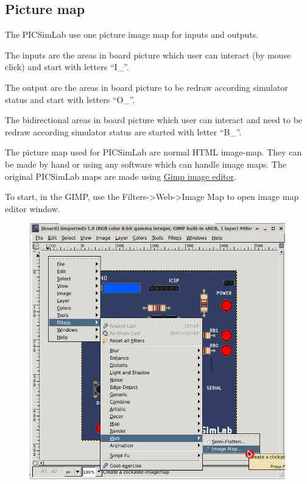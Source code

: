 \pagebreak
\subsection{Picture map}
The PICSimLab use one picture image map for inputs and outputs. 

The inputs are the areas in board picture which user can interact (by mouse click) and 
start with letters ``I\_''. 

The output are the areas in board picture to be redraw according simulator status and start with
letters ``O\_''. 

The bidirectional areas in board picture which user can interact and need to be redraw according simulator status 
are started with letter ``B\_''. 

The picture map used for PICSimLab are normal HTML image-map. They can be made by hand or using any software which 
can handle image maps. The original PICSimLab maps are made using \href{http://www.gimp.org/}{Gimp image editor}.     

To start, in the GIMP, use the Filters->Web->Image Map to open image map editor window.
\begin{figure}[H]
\center
\includegraphics[width=0.99\textwidth]{img/hb/gimp01.png} 
\end{figure} 

